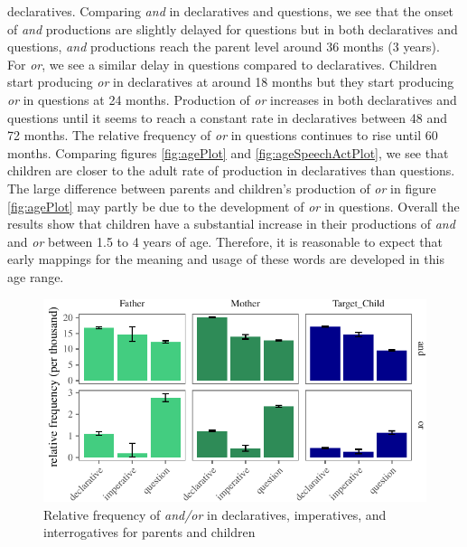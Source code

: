 \documentclass[oneside]{report}
\theoremstyle{definition}
\theoremstyle{definition}
\theoremstyle{definition}
\theoremstyle{remark}
\begin{document}
declaratives. Comparing \emph{and} in declaratives and questions, we see
that the onset of \emph{and} productions are slightly delayed for
questions but in both declaratives and questions, \emph{and} productions
reach the parent level around 36 months (3 years). For \emph{or}, we see
a similar delay in questions compared to declaratives. Children start
producing \emph{or} in declaratives at around 18 months but they start
producing \emph{or} in questions at 24 months. Production of \emph{or}
increases in both declaratives and questions until it seems to reach a
constant rate in declaratives between 48 and 72 months. The relative
frequency of \emph{or} in questions continues to rise until 60 months.
Comparing figures \ref{fig:agePlot} and \ref{fig:ageSpeechActPlot}, we
see that children are closer to the adult rate of production in
declaratives than questions. The large difference between parents and
children's production of \emph{or} in figure \ref{fig:agePlot} may
partly be due to the development of \emph{or} in questions. Overall the
results show that children have a substantial increase in their
productions of \emph{and} and \emph{or} between 1.5 to 4 years of age.
Therefore, it is reasonable to expect that early mappings for the
meaning and usage of these words are developed in this age range.
\begin{figure}[tb]

{\centering \includegraphics{figs/freqTablebySpeechAct-1} 

}

\caption{Relative frequency of \textit{and/or} in declaratives, imperatives, and interrogatives for parents and children }\label{fig:freqTablebySpeechAct}
\end{figure}
\end{document}
